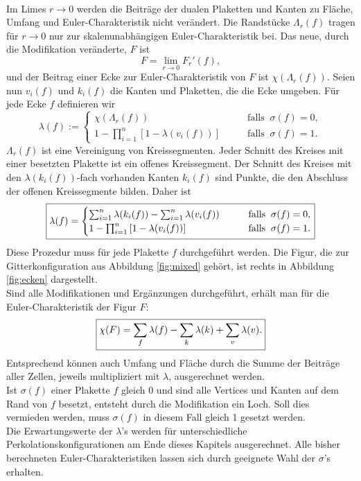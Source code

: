 \\Im Limes $r \rightarrow 0$ werden die Beitr\"age der dualen Plaketten und Kanten zu Fl\"ache, Umfang und Euler-Charakteristik nicht ver\"andert. Die Randst\"ucke $\Lambda_r(f)$ tragen f\"ur $r\rightarrow 0$ nur zur skalenunabh\"angigen Euler-Charakteristik bei. Das neue, durch die Modifikation ver\"anderte, $F$ ist
\begin{equation}
  F=\lim_{r\rightarrow 0}F_r'(f),
\end{equation}
und der Beitrag einer Ecke zur Euler-Charakteristik von $F$ ist $\chi(\Lambda_r(f))$.
Seien nun $v_i(f)$ und $k_i(f)$ die Kanten und Plaketten, die die Ecke umgeben. F\"ur jede Ecke $f$ definieren wir  
\begin{equation}
  \lambda(f):= \begin{cases} \chi(\Lambda_r(f)) \qquad & \text{falls} \;\; \sigma(f)=0, \\ 1-\prod_{i=1}^n\left[1-\lambda(v_i(f))\right] \qquad & \text{falls} \;\; \sigma(f)=1.
\end{cases}
\end{equation}
$\Lambda_r(f)$ ist eine Vereinigung von Kreissegmenten. Jeder Schnitt des Kreises mit einer besetzten Plakette ist ein offenes Kreissegment. Der Schnitt des Kreises mit den $\lambda(k_i(f))$-fach vorhanden Kanten $k_i(f)$ sind Punkte, die den Abschluss der offenen Kreissegmente bilden. Daher ist  
 \begin{equation}
\fbox{$\displaystyle
  \lambda(f)= \begin{cases} \sum_{i=1}^n \lambda(k_i(f))-\sum_{i=1}^n\lambda(v_i(f)) \qquad & \text{falls} \;\; \sigma(f)=0, \\ 1-\prod_{i=1}^n\left[1-\lambda(v_i(f))\right] \qquad & \text{falls} \;\; \sigma(f)=1.
\end{cases}
$}
\end{equation}
Diese Prozedur muss f\"ur jede Plakette $f$ durchgef\"uhrt werden. Die Figur, die zur Gitterkonfiguration aus Abbildung \ref{fig:mixed} geh\"ort, ist rechts in Abbildung \ref{fig:ecken} dargestellt. \\
 
Sind alle Modifikationen und Erg\"anzungen durchgef\"uhrt, erh\"alt man f\"ur die Euler-Charakteristik der Figur $F$:
\begin{equation}
\fbox{$\displaystyle
  \chi(F)=\sum_{f}\lambda(f)-\sum_{k}\lambda(k)+\sum_{v}\lambda(v).
$}
\end{equation}
Entsprechend k\"onnen auch Umfang und Fl\"ache durch die Summe der Beitr\"age aller Zellen, jeweils multipliziert mit $\lambda$, ausgerechnet werden.
\\Ist $\sigma(f)$ einer Plakette $f$ gleich 0 und sind alle Vertices und Kanten auf dem Rand von $f$ besetzt, entsteht durch die Modifikation ein Loch. Soll dies vermieden werden, muss $\sigma(f)$ in diesem Fall gleich 1 gesetzt werden. 
\\Die Erwartungswerte der $\lambda$'s werden f\"ur unterschiedliche Perkolationskonfigurationen am Ende dieses Kapitels ausgerechnet. Alle bisher berechneten Euler-Charakteristiken lassen sich durch geeignete Wahl der $\sigma$'s erhalten. 

